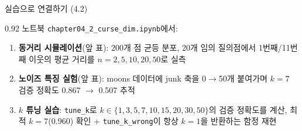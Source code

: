 \begin{frame}{실습으로 연결하기 (4.2)}
\begin{center}\begin{varwidth}{0.92\textwidth}
  노트북 \texttt{chapter04\_2\_curse\_dim.ipynb}에서:
  \begin{enumerate}
    \item \textbf{동거리 시뮬레이션}(앞 표): 200개 점 균등 분포,
      20개 임의 질의점에서 1번째/11번째 이웃의 평균 거리를
      $n=2,5,10,20,50$로 실측
    \item \textbf{노이즈 특징 실험}(앞 표): moons 데이터에
      junk 축을 0$\to$50개 붙여가며 $k=7$ 검증 정확도
      0.867 $\to$ 0.507 추적
    \item \textbf{$k$ 튜닝 실습}: \texttt{tune\_k}로
      $k \in \{1,3,5,7,10,15,20,30,50\}$의 검증 정확도를 계산,
      최적 $k=7$(0.960) 확인 + \texttt{tune\_k\_wrong}이
      항상 $k=1$을 반환하는 함정 재현
  \end{enumerate}
\end{varwidth}\end{center}
\end{frame}

